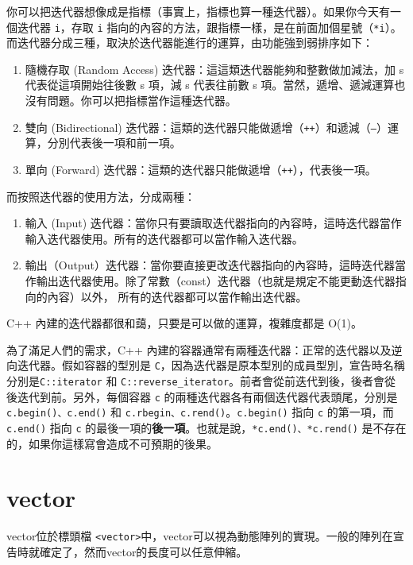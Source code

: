 \documentclass[a4paper, 11pt, oneside]{book}
\begin{document}
你可以把迭代器想像成是指標（事實上，指標也算一種迭代器）。如果你今天有一個迭代器 \texttt{i}，存取 \texttt{i} 指向的內容的方法，跟指標一樣，是在前面加個星號（\texttt{*i}）。而迭代器分成三種，取決於迭代器能進行的運算，由功能強到弱排序如下：
\begin{enumerate}
    \item 隨機存取 (Random Access) 迭代器：這這類迭代器能夠和整數做加減法，加 s 代表從這項開始往後數 s 項，減 s 代表往前數 s 項。當然，遞增、遞減運算也沒有問題。你可以把指標當作這種迭代器。

    \item 雙向 (Bidirectional) 迭代器：這類的迭代器只能做遞增（\texttt{++}）和遞減（\texttt{--}）運算，分別代表後一項和前一項。
    \item 單向 (Forward) 迭代器：這類的迭代器只能做遞增（\texttt{++}），代表後一項。
\end{enumerate}

而按照迭代器的使用方法，分成兩種：
\begin{enumerate}
    \item 輸入 (Input) 迭代器：當你只有要讀取迭代器指向的內容時，這時迭代器當作輸入迭代器使用。所有的迭代器都可以當作輸入迭代器。
    \item 輸出（Output）迭代器：當你要直接更改迭代器指向的內容時，這時迭代器當作輸出迭代器使用。除了常數（const）迭代器（也就是規定不能更動迭代器指向的內容）以外， 所有的迭代器都可以當作輸出迭代器。
\end{enumerate}

C++ 內建的迭代器都很和藹，只要是可以做的運算，複雜度都是 O(1)。

為了滿足人們的需求，C++ 內建的容器通常有兩種迭代器：正常的迭代器以及逆向迭代器。假如容器的型別是 \texttt{C}，因為迭代器是原本型別的成員型別，宣告時名稱分別是\texttt{C::iterator} 和 \texttt{C::reverse\_iterator}。前者會從前迭代到後，後者會從後迭代到前。另外，每個容器 \texttt{c} 的兩種迭代器各有兩個迭代器代表頭尾，分別是\texttt{c.begin()、c.end()} 和 \texttt{c.rbegin、c.rend()}。\texttt{c.begin()} 指向 \texttt{c} 的第一項，而 \texttt{c.end()} 指向 \texttt{c} 的最後一項的\textbf{後一項}。也就是說，\texttt{*c.end()、*c.rend()} 是不存在的，如果你這樣寫會造成不可預期的後果。

\section{vector}

vector位於標頭檔 \texttt{<vector>}中，vector可以視為動態陣列的實現。一般的陣列在宣告時就確定了，然而vector的長度可以任意伸縮。
\end{document}
